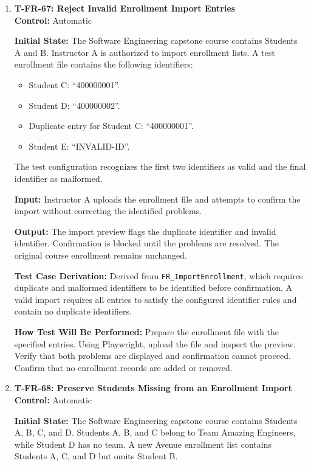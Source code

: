\documentclass[12pt, titlepage]{article}
\begin{document}
\begin{enumerate}
\item \label{T-FR-67}\textbf{T-FR-67: Reject Invalid Enrollment Import Entries}\\

\textbf{Control:} Automatic

\textbf{Initial State:} The Software Engineering capstone course contains Students A and B. Instructor A is authorized to import enrollment lists. A test enrollment file contains the following identifiers:
\begin{itemize}
    \item Student C: ``400000001''.
    \item Student D: ``400000002''.
    \item Duplicate entry for Student C: ``400000001''.
    \item Student E: ``INVALID-ID''.
\end{itemize}
The test configuration recognizes the first two identifiers as valid and the final identifier as malformed.

\textbf{Input:} Instructor A uploads the enrollment file and attempts to confirm the import without correcting the identified problems.

\textbf{Output:} The import preview flags the duplicate identifier and invalid identifier. Confirmation is blocked until the problems are resolved. The original course enrollment remains unchanged.

\textbf{Test Case Derivation:} Derived from \texttt{FR\_ImportEnrollment}, which requires duplicate and malformed identifiers to be identified before confirmation. A valid import requires all entries to satisfy the configured identifier rules and contain no duplicate identifiers.

\textbf{How Test Will Be Performed:} Prepare the enrollment file with the specified entries. Using Playwright, upload the file and inspect the preview. Verify that both problems are displayed and confirmation cannot proceed. Confirm that no enrollment records are added or removed.

\item \label{T-FR-68}\textbf{T-FR-68: Preserve Students Missing from an Enrollment Import}\\

\textbf{Control:} Automatic

\textbf{Initial State:} The Software Engineering capstone course contains Students A, B, C, and D. Students A, B, and C belong to Team Amazing Engineers, while Student D has no team. A new Avenue enrollment list contains Students A, C, and D but omits Student B.


\end{enumerate}
\end{document}
